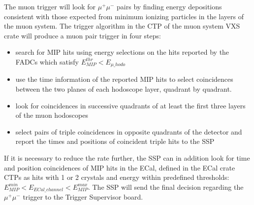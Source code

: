 
The muon trigger will look for 
$\mu^+\mu^-$ pairs by finding energy depositions consistent with those expected from minimum ionizing particles in the layers of the muon system.  
The trigger algorithm in the CTP of the muon system  VXS crate will produce a muon pair trigger in four steps:
\begin{itemize}
\item search for MIP hits using energy selections on the hits reported by the FADCs which satisfy $E_{MIP}^{thr}<E_{\mu\_hodo}$
\item use the time information of the reported MIP hits to select coincidences between the two planes of each hodoscope layer, quadrant by quadrant.  
\item look for coincidences in successive quadrants of at least the first three layers of the muon hodoscopes 
\item select pairs of triple coincidences in opposite quadrants of the detector and report the times and positions of coincident triple hits 
to the SSP 
\end{itemize}
If it is necessary to reduce the rate further, the SSP can in addition look for time and position coincidences of MIP hits in the ECal, defined in the ECal 
crate CTPs as hits with 1 or 2 crystals and energy within predefined thresholds: $E_{MIP}^{min}<E_{ECal\_channel}<E_{MIP}^{max}$. 
The SSP will send the final decision regarding the $\mu^+\mu^-$ trigger to the Trigger Supervisor  board. 



